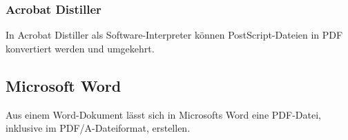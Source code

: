 \subsubsection{Acrobat Distiller}
In Acrobat Distiller als Software-Interpreter können PostScript-Dateien in PDF konvertiert werden und umgekehrt. \cite{schneeberger}

\subsection{Microsoft Word}
Aus einem Word-Dokument lässt sich in Microsofts Word eine PDF-Datei, inklusive im PDF/A-Dateiformat, erstellen. \cite{adobe-pdf-a}
